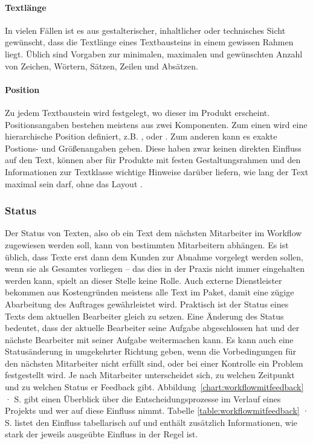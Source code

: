 \paragraph{Textlänge} In vielen Fällen ist es aus gestalterischer, inhaltlicher oder technisches Sicht gewünscht, dass die Textlänge eines Textbausteins in einem gewissen Rahmen liegt. Üblich sind Vorgaben zur minimalen, maximalen und gewünschten Anzahl von Zeichen, Wörtern, Sätzen, Zeilen und Absätzen.

\paragraph{Position} Zu jedem Textbaustein wird festgelegt, wo dieser im Produkt erscheint. Positionsangaben bestehen meistens aus zwei Komponenten. Zum einen wird eine hierarchische Position definiert, z.B. , oder . Zum anderen kann es exakte Postions- und Größenangaben geben. Diese haben zwar keinen direkten Einfluss auf den Text, können aber für Produkte mit festen Gestaltungsrahmen und den Informationen zur Textklasse wichtige Hinweise darüber liefern, wie lang der Text maximal sein darf, ohne das Layout .

\subsubsection{Status}\label{l:konzept-workflow-status}

Der Status von Texten, also ob ein Text dem nächsten Mitarbeiter im Workflow zugewiesen werden soll, kann von bestimmten Mitarbeitern abhängen. Es ist üblich, dass Texte erst dann dem Kunden zur Abnahme vorgelegt werden sollen, wenn sie als Gesamtes vorliegen -- das dies in der Praxis nicht immer eingehalten werden kann, spielt  an dieser Stelle keine Rolle. Auch externe Dienstleister bekommen aus Kostengründen meistens alle Text im Paket, damit eine zügige Abarbeitung des Auftrages gewährleistet wird. Praktisch ist der Status eines Texts dem aktuellen Bearbeiter gleich zu setzen. Eine Änderung des Status bedeutet, dass der aktuelle Bearbeiter seine Aufgabe abgeschlossen hat und der nächste Bearbeiter mit seiner Aufgabe weitermachen kann. Es kann auch eine Statusänderung in umgekehrter Richtung geben, wenn die Vorbedingungen für den nächsten Mitarbeiter nicht erfüllt sind, oder bei einer Kontrolle ein Problem festgestellt wird. Je nach Mitarbeiter unterscheidet sich, zu welchen Zeitpunkt und zu welchen Status er Feedback gibt. Abbildung~\ref{chart:workflowmitfeedback} · S.\pageref{chart:workflowmitfeedback} gibt einen Überblick über die Entscheidungsprozesse im Verlauf eines Projekts und wer auf diese Einfluss nimmt. Tabelle \ref{table:workflowmitfeedback} · S.\pageref{table:workflowmitfeedback} listet den Einfluss tabellarisch auf und enthält zusätzlich Informationen, wie stark der jeweils ausgeübte Einfluss in der Regel ist.

